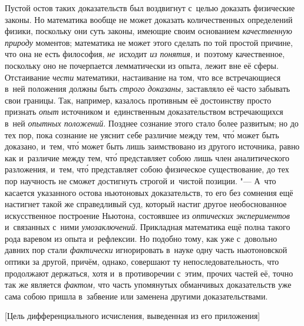 Пустой остов таких доказательств был воздвигнут с~целью доказать физические
законы. Но математика вообще не может доказать количественных определений
физики, поскольку они суть законы, имеющие своим основанием {\em качественную
природу} моментов; математика не может этого сделать по той простой причине,
что она не есть философия, {\em не}~исходит {\em из понятия,} и~поэтому
качественное, поскольку оно не почерпается лемматически из опыта, лежит вне её
сферы. Отстаивание {\em чести} математики, настаивание на том, что все
встречающиеся в~ней положения должны быть {\em строго доказаны,} заставляло её
часто забывать свои границы. Так, например, казалось противным её достоинству
просто признать {\em опыт} источником и~единственным доказательством
встречающихся в~ней {\em опытных положений}. Позднее сознание этого
стало более развитым; но до тех пор, пока сознание не уяснит
себе различие между тем, чт\'{о} может быть доказано, и~тем, чт\'{о} может быть лишь
заимствовано из другого источника, равно как и~различие между тем, чт\'{о}
представляет собою лишь член аналитического разложения, и~тем, чт\'{о} представляет
собою физическое существование, до тех пор научность не сможет достигнуть
строгой и~чистой позиции. "--- А~что касается указанного остова ньютоновых
доказательств, то его без сомнения ещё настигнет такой же справедливый суд,
который настиг другое необоснованное искусственное построение Ньютона,
состоявшее из {\em оптических экспериментов} и~связанных с~ними
{\em умозаключений}. Прикладная математика ещё полна такого рода варевом из
опыта и~рефлексии. Но подобно тому, как уже с~довольно давних пор стали
{\em фактически} игнорировать в~науке одну часть ньютоновской оптики за другой,
причём, однако, совершают ту непоследовательность, что продолжают держаться,
хотя и~в противоречии с~этим, прочих частей её, точно так же является
{\em фактом,} что часть упомянутых обманчивых доказательств уже сама собою
пришла в~забвение или заменена другими доказательствами.

%
{[Цель дифференциального исчисления, выведенная из его приложения]}

